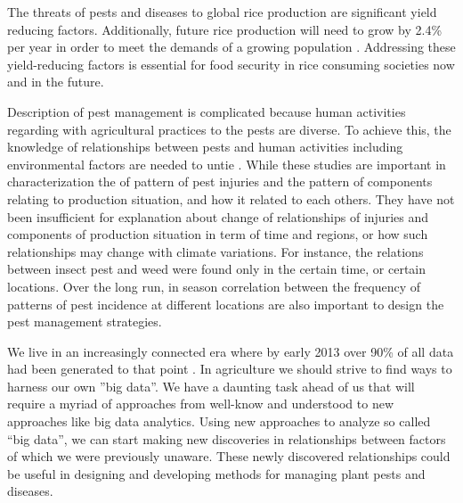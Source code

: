 The threats of pests and diseases to global rice production are significant yield reducing factors. Additionally, future rice production will need to grow by 2.4\% per year in order to meet the demands of a growing population . Addressing these yield-reducing factors is essential for food security in rice consuming societies now and in the future. 

Description of pest management is complicated because human activities regarding with agricultural practices to the pests are diverse. To achieve this, the knowledge of relationships between pests and human activities including environmental factors are needed to untie . While these studies are important in characterization the of pattern of pest injuries and the pattern of components relating to production situation, and how it related to each others. They have not been insufficient for explanation about change of relationships of injuries and components of production situation in term of time and regions, or how such relationships may change with climate variations.  For instance, the  relations between insect pest and weed were found only in the certain time, or certain locations. Over the long run, in season correlation between the frequency of patterns of pest incidence at different locations are also important to design the pest management strategies.

We live in an increasingly connected era where by early 2013 over 90\% of all data had been generated to that point . In agriculture we should strive to find ways to harness our own ''big data''. We have a daunting task ahead of us that will require a myriad of approaches from well-know and understood to new approaches like big data analytics. Using new approaches to analyze so called ``big data'', we can start making new discoveries in relationships between factors of which we were previously unaware. These newly discovered relationships could be useful in designing and developing methods for managing plant pests and diseases.

